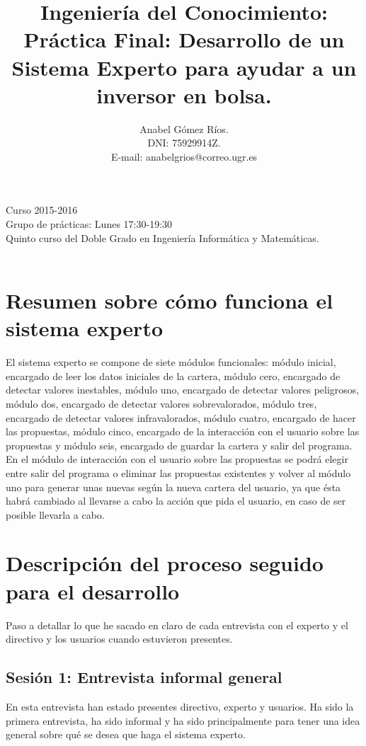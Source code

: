 \documentclass[12pt]{article}
\title{Ingeniería del Conocimiento:\\
Práctica Final: Desarrollo de un Sistema Experto para ayudar a un inversor en bolsa.}
\author{Anabel G\'omez R\'ios.\\
 DNI: 75929914Z.\\
 E-mail: anabelgrios@correo.ugr.es}
\begin{document}
\maketitle

\begin{center}
Curso 2015-2016\\

Grupo de prácticas: Lunes 17:30-19:30\\

Quinto curso del Doble Grado en Ingeniería Informática y Matemáticas.\\
\textit{ }\\
\end{center}

\newpage

\tableofcontents

\newpage

\section{Resumen sobre cómo funciona el sistema experto}
El sistema experto se compone de siete módulos funcionales: módulo inicial, encargado de leer los datos iniciales de la cartera, módulo cero, encargado de detectar valores inestables, módulo uno, encargado de detectar valores peligrosos, módulo dos, encargado de detectar valores sobrevalorados, módulo tres, encargado de detectar valores infravalorados, módulo cuatro, encargado de hacer las propuestas, módulo cinco, encargado de la interacción con el usuario sobre las propuestas y módulo seis, encargado de guardar la cartera y salir del programa.\\

En el módulo de interacción con el usuario sobre las propuestas se podrá elegir entre salir del programa o eliminar las propuestas existentes y volver al módulo uno para generar unas nuevas según la nueva cartera del usuario, ya que ésta habrá cambiado al llevarse a cabo la acción que pida el usuario, en caso de ser posible llevarla a cabo.

\section{Descripción del proceso seguido para el desarrollo}

Paso a detallar lo que he sacado en claro de cada entrevista con el experto y el directivo y los usuarios cuando estuvieron presentes.

\subsection{Sesión 1: Entrevista informal general}
En esta entrevista han estado presentes directivo, experto y usuarios. Ha sido la primera entrevista, ha sido informal y ha sido principalmente para tener una idea general sobre qué se desea que haga el sistema experto.\\
\end{document}
